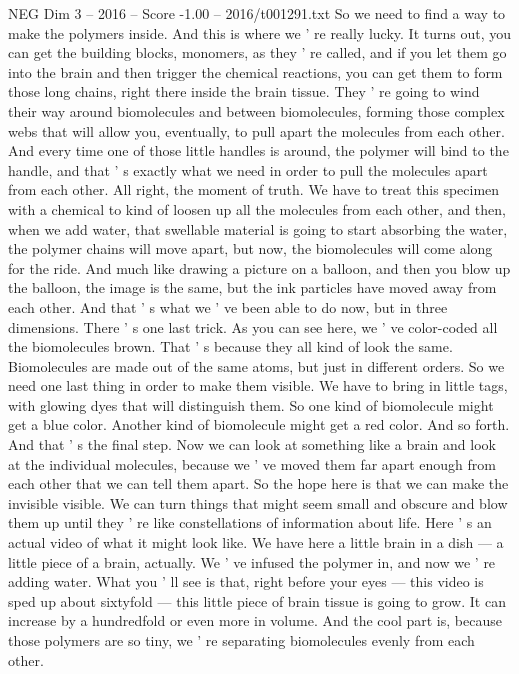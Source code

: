 \begin{textsample}{NEG Dim 3 – 2016 – Score -1.00 – 2016/t001291.txt}
So we need to find a way to make the polymers inside.
And this is where we ' re really lucky.
It turns out, you can get the building blocks, monomers, as they ' re called, and if you let them go into the brain and then trigger the chemical reactions, you can get them to form those long chains, right there inside the brain tissue.
They ' re going to wind their way around biomolecules and between biomolecules, forming those complex webs that will allow you, eventually, to pull apart the molecules from each other.
And every time one of those little handles is around, the polymer will bind to the handle, and that ' s exactly what we need in order to pull the molecules apart from each other.
All right, the moment of truth.
We have to treat this specimen with a chemical to kind of loosen up all the molecules from each other, and then, when we add water, that swellable material is going to start absorbing the water, the polymer chains will move apart, but now, the biomolecules will come along for the ride.
And much like drawing a picture on a balloon, and then you blow up the balloon, the image is the same, but the ink particles have moved away from each other.
And that ' s what we ' ve been able to do now, but in three dimensions.
There ' s one last trick.
As you can see here, we ' ve color-coded all the biomolecules brown.
That ' s because they all kind of look the same.
Biomolecules are made out of the same atoms, but just in different orders.
So we need one last thing in order to make them visible.
We have to bring in little tags, with glowing dyes that will distinguish them.
So one kind of biomolecule might get a blue color.
Another kind of biomolecule might get a red color.
And so forth.
And that ' s the final step.
Now we can look at something like a brain and look at the individual molecules, because we ' ve moved them far apart enough from each other that we can tell them apart.
So the hope here is that we can make the invisible visible.
We can turn things that might seem small and obscure and blow them up until they ' re like constellations of information about life.
Here ' s an actual video of what it might look like.
We have here a little brain in a dish — a little piece of a brain, actually.
We ' ve infused the polymer in, and now we ' re adding water.
What you ' ll see is that, right before your eyes — this video is sped up about sixtyfold — this little piece of brain tissue is going to grow.
It can increase by a hundredfold or even more in volume.
And the cool part is, because those polymers are so tiny, we ' re separating biomolecules evenly from each other.

\end{textsample}
